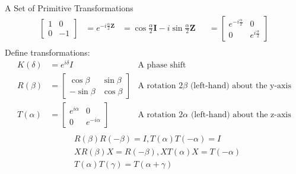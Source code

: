 \documentclass{beamer}
\begin{document}
\begin{frame}{A Set of Primitive Transformations}
{\begin{align*}
                                                                     \begin{bmatrix}
                                                                       1 & 0 \\
                                                                       0 & -1
                                                                     \end{bmatrix}
                  &= e^{-i\frac{\alpha}2\mathbf{Z}}
                  &= \cos\frac{\alpha}2\mathbf{I} - i\sin\frac{\alpha}2 \mathbf{Z}
                  &&=\begin{bmatrix}
                    e^{-i\frac{\alpha}2} & 0 \\
                    0 & e^{i\frac{\alpha}2}
                    \end{bmatrix} \\
    \end{align*}
    Define transformations:
    \begin{align*}
      K(\delta) &= e^{i\delta}I & \mbox{A phase shift} \\
      R(\beta)  &= \begin{bmatrix} \cos\beta & \sin\beta \\ -\sin\beta & \cos\beta \end{bmatrix}  & \mbox{A rotation $2\beta$ (left-hand) about the y-axis} \\
      T(\alpha) &= \begin{bmatrix} e^{i\alpha} & 0 \\ 0 & e^{-i\alpha} \end{bmatrix} & \mbox{A rotation $2\alpha$ (left-hand) about the z-axis} \\
    \end{align*}
    \begin{align*}
      &R(\beta)R(-\beta) = I, T(\alpha)T(-\alpha) = I \\
      &XR(\beta)X = R(-\beta), XT(\alpha)X = T(-\alpha) \\
      &T(\alpha)T(\gamma) = T(\alpha + \gamma)
    \end{align*}
  }%
\end{frame}
\end{document}
